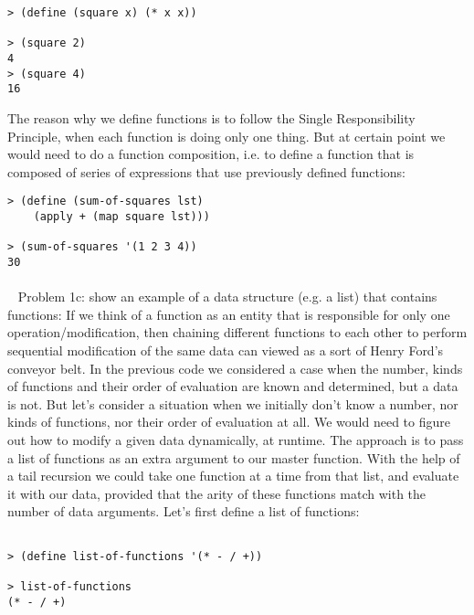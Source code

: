 \documentclass{article}
\begin{document}
\begin{verbatim} 
> (define (square x) (* x x))

> (square 2)
4
> (square 4)
16
\end{verbatim}

The reason why we define functions is to follow the Single Responsibility Principle, when each function is doing only one thing. But at certain point we would need to do a function composition, i.e. to define a function that is composed of series of expressions that use previously defined functions:

\begin{verbatim} 
> (define (sum-of-squares lst)
    (apply + (map square lst)))
    
> (sum-of-squares '(1 2 3 4))
30
\end{verbatim}
\paragraph{}\
\rmfamily
Problem 1c: show an example of a data structure (e.g. a list) that contains functions:
\newline
\newline
If we think of a function as an entity that is responsible for only one operation/modification, then chaining different functions to each other to perform sequential modification of the same data can viewed as a sort of Henry Ford's conveyor belt. In the previous code we considered a case when the number, kinds of functions and their order of evaluation are known and determined, but a data is not. But let's consider a situation when we initially don't know a number, nor kinds of functions, nor their order of evaluation at all. We would need to figure out how to modify a given data dynamically, at runtime. The approach is to pass a list of functions as an extra argument to our master function. With the help of a tail recursion we could take one function at a time from that list, and evaluate it with our data, provided that the arity of these functions match with the number of data arguments. Let's first define a list of functions:

\begin{verbatim} 

> (define list-of-functions '(* - / +))

> list-of-functions
(* - / +)

\end{verbatim}
\end{document}
